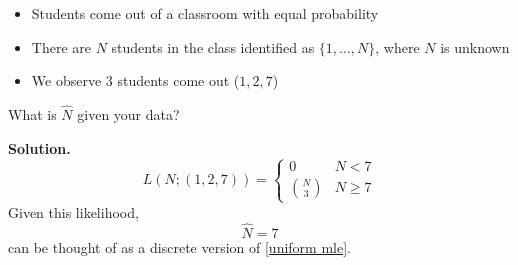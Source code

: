 \begin{exbox}
    \begin{example} $ \; $
        \begin{itemize}
            \item Students come out of a classroom with equal probability
            \item There are $ N $ students in the class identified as $ \{1,\ldots ,N\} $, where
                  $ N $ is unknown
            \item We observe $ 3 $ students come out ($ 1,2,7 $)
        \end{itemize}
        What is $ \hat{N} $ given your data?

        \textbf{Solution.}
        \[ L(N;(1,2,7))=
            \begin{cases}
                0            & N<7          \\
                \binom{N}{3} & N\geqslant 7
            \end{cases} \]
        Given this likelihood,
        \[ \hat{N}=7 \]
        can be thought of as a discrete version of \ref{uniform mle}.
    \end{example}
\end{exbox}

